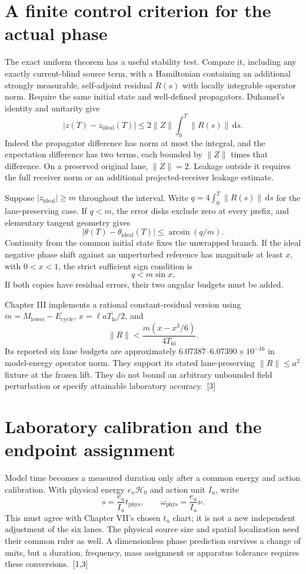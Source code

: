 \documentclass[10pt,twocolumn,letterpaper]{article}
\newcommand{\dd}{\mathrm{d}}
\begin{document}
\section{A finite control criterion for the actual phase}
The exact uniform theorem has a useful stability test. Compare it, including any exactly current-blind source term, with a Hamiltonian containing an additional strongly measurable, self-adjoint residual $R(s)$ with locally integrable operator norm. Require the same initial state and well-defined propagators. Duhamel's identity and unitarity give
\[
 |z(T)-z_{\mathrm{ideal}}(T)|
 \le 2\|Z\|\int_0^T\|R(s)\|\,\dd s.
\]
Indeed the propagator difference has norm at most the integral, and the expectation difference has two terms, each bounded by $\|Z\|$ times that difference. On a preserved original lane, $\|Z\|=2$. Leakage outside it requires the full receiver norm or an additional projected-receiver leakage estimate.

Suppose $|z_{\mathrm{ideal}}|\ge m$ throughout the interval. Write $q=4\int_0^T\|R(s)\|\,\dd s$ for the lane-preserving case. If $q<m$, the error disks exclude zero at every prefix, and elementary tangent geometry gives
\[
 |\theta(T)-\theta_{\mathrm{ideal}}(T)|
 \le\arcsin(q/m).
\]
Continuity from the common initial state fixes the unwrapped branch. If the ideal negative phase shift against an unperturbed reference has magnitude at least $x$, with $0<x<1$, the strict sufficient sign condition is
\[
 q<m\sin x.
\]
If both copies have residual errors, their two angular budgets must be added.

Chapter III implements a rational constant-residual version using $m=M_{\mathrm{lower}}-E_{\mathrm{cycle}}$, $x=\ell aT_{\mathrm{lo}}/2$, and
\[
 \|R\|<\frac{m(x-x^3/6)}{4T_{\mathrm{hi}}}.
\]
Its reported six lane budgets are approximately $6.07387$--$6.07390\times 10^{-16}$ in model-energy operator norm. They support its stated lane-preserving $\|R\|\le a^2$ fixture at the frozen lift. They do not bound an arbitrary unbounded field perturbation or specify attainable laboratory accuracy.~[3]











\section{Laboratory calibration and the endpoint assignment}
Model time becomes a measured duration only after a common energy and action calibration. With physical energy $e_u\mathcal H_0$ and action unit $I_u$, write
\[
 s=\frac{e_u}{I_u}t_{\mathrm{phys}},\qquad
 \omega_{\mathrm{phys}}=\frac{e_u}{I_u}\nu.
\]
This must agree with Chapter VII's chosen $t_u$ chart; it is not a new independent adjustment of the six lanes. The physical source size and spatial localization need their common ruler as well. A dimensionless phase prediction survives a change of units, but a duration, frequency, mass assignment or apparatus tolerance requires these conversions.~[1,3]
\end{document}

